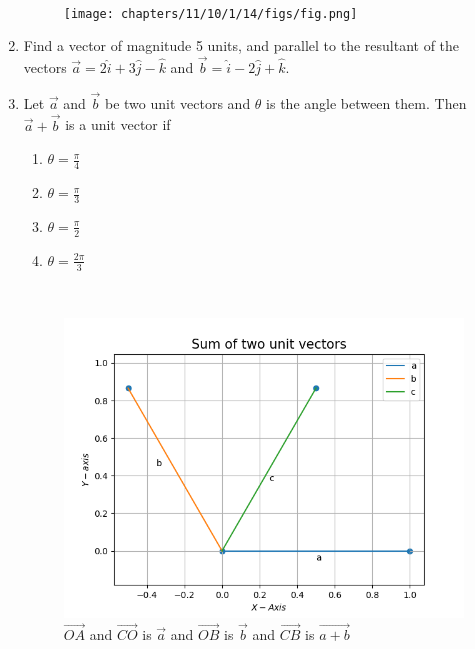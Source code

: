 \begin{enumerate}[label=\thesection.\arabic*,ref=\thesection.\theenumi]
\\
\begin{figure}[ht]
\centering
\texttt{[image: chapters/11/10/1/14/figs/fig.png]}
\caption{}
\label{fig:chapters/11/10/1/14/1}
\end{figure}
\solution

\item Find a vector of magnitude 5 units, and parallel to the resultant of the vectors $\vec{a}=2\hat{i}+3\hat{j}-\hat{k}$ and $\vec{b}=\hat{i}-2\hat{j}+\hat{k}$.\\

\item Let $\vec{a}$ and $\vec{b}$ be two unit vectors and $\theta$ is the angle between them. Then $\vec{a}+\vec{b}$ is a unit vector if
	\begin{enumerate}
		\item $\theta = \frac{\pi}{4}$
		\item $\theta = \frac{\pi}{3}$
		\item $\theta = \frac{\pi}{2}$
		\item $\theta = \frac{2\pi}{3}$
			\end{enumerate}
\solution

\\
\begin{figure}[!h]
	\begin{center}
	\includegraphics[width=\columnwidth]{chapters/12/10/5/17/codes/Python/figs/fig.png}
	\end{center}
	\caption{$\vec{OA}$ and $\vec{CO}$ is $\vec{a}$ and $\vec{OB}$ is $\vec{b}$ and $\vec{CB}$ is $\vec{a+b}$}
	\label{fig:12/10/5/17}
\end{figure}


\end{enumerate}
